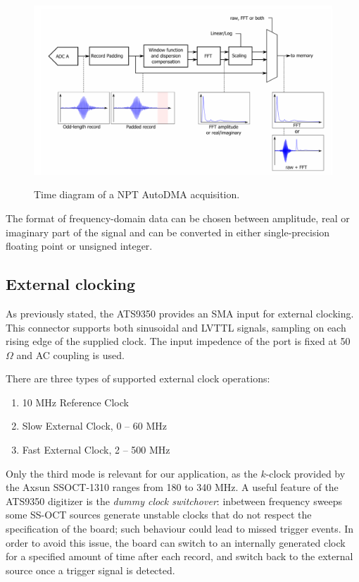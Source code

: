     \begin{figure}[bth]
    	\myfloatalign
    	{\includegraphics[width=.95\linewidth]{gfx/ch3/fft-module}}
    	\caption{Time diagram of a NPT AutoDMA acquisition.}\label{fig:fft-module}
    \end{figure}
    
    The format of frequency-domain data can be chosen between amplitude, real or imaginary part of the signal and can be converted in either single-precision floating point or unsigned integer. 
    
    \subsection{External clocking}
    As previously stated, the ATS9350 provides an SMA input for external clocking. This connector supports both sinusoidal and \ac{LVTTL} signals, sampling on each rising edge of the supplied clock. The input impedence of the port is fixed at 50 $\Omega$ and AC coupling is used.
    
    There are three types of supported external clock operations:
    \begin{enumerate}
    	\item 10 MHz Reference Clock
    	\item Slow External Clock, 0 -- 60 MHz
    	\item Fast External Clock, 2 -- 500 MHz
    \end{enumerate} 

	Only the third mode is relevant for our application, as the $k$-clock provided by the Axsun SSOCT-1310 ranges from 180 to 340 MHz. A useful feature of the ATS9350 digitizer is the \emph{dummy clock switchover}: inbetween frequency sweeps some SS-OCT sources generate unstable clocks that do not respect the specification of the board; such behaviour could lead to missed trigger events. In order to avoid this issue, the board can switch to an internally generated clock for a specified amount of time after each record, and switch back to the external source once a trigger signal is detected. 
	
